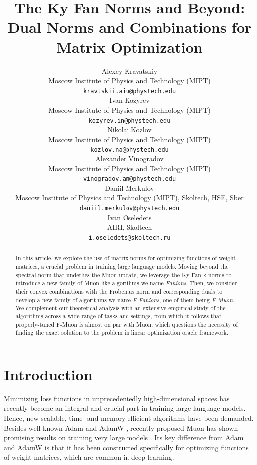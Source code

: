 \documentclass{article} %
\title{The Ky Fan Norms and Beyond: Dual Norms and Combinations for Matrix Optimization}
\author{Alexey Kravatskiy \\
Moscow Institute of Physics and Technology (MIPT) \\
\texttt{kravtskii.aiu@phystech.edu} \\
\And
Ivan Kozyrev \\
Moscow Institute of Physics and Technology (MIPT) \\
\texttt{kozyrev.in@phystech.edu} \\
\And
Nikolai Kozlov \\
Moscow Institute of Physics and Technology (MIPT) \\
\texttt{kozlov.na@phystech.edu} \\
\And
Alexander Vinogradov \\
Moscow Institute of Physics and Technology (MIPT) \\
\texttt{vinogradov.am@phystech.edu} \\
\And
Daniil Merkulov \\
Moscow Institute of Physics and Technology (MIPT), Skoltech, HSE, Sber \\
\texttt{daniil.merkulov@phystech.edu} \\
\And
Ivan Oseledets \\
AIRI, Skoltech \\
\texttt{i.oseledets@skoltech.ru}
}
\begin{document}
\maketitle

\begin{abstract}

In this article, we explore the use of matrix norms for optimizing functions of weight matrices, a crucial problem in training large language models. Moving beyond the spectral norm that underlies the Muon update, we leverage the Ky Fan k-norms to introduce a new family of Muon-like algorithms we name {\it Fanions}. Then, we consider their convex combinations with the Frobenius norm and corresponding duals to develop a new family of algorithms we name {\it F-Fanions}, one of them being {\it F-Muon}. We complement our theoretical analysis with an extensive empirical study of the algorithms across a wide range of tasks and settings, from which it follows that properly-tuned F-Muon is almost on par with Muon, which questions the necessity of finding the exact solution to the problem in linear optimization oracle framework.

\end{abstract}

\section{Introduction}
 Minimizing loss functions in unprecedentedly high-dimensional spaces has recently become an integral and crucial part in training large language models. Hence, new scalable, time- and memory-efficient algorithms have been demanded. Besides well-known Adam \citep{kingma2014adam} and AdamW \citep{loshchilov2017decoupled}, recently proposed Muon \citep{jordan2024muon} has shown promising results on training very large models \citep{liu2025muon}. Its key difference from Adam and AdamW is that it has been constructed specifically for optimizing functions of weight matrices, which are common in deep learning.
 
\end{document}
